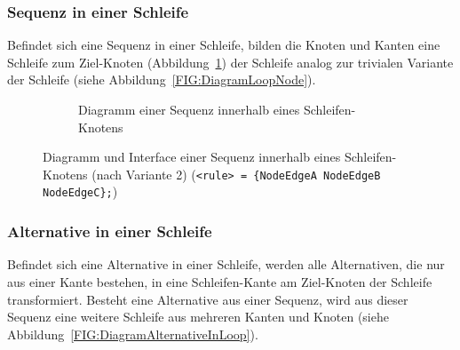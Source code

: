 \documentclass[../InterneDSLs.tex]{subfiles}
\begin{document}
\subsubsection{Sequenz in einer Schleife}
Befindet sich eine Sequenz in einer Schleife, bilden die Knoten und Kanten eine Schleife zum Ziel-Knoten (Abbildung~\ref{FIG:DiagramSequenceInLoop}) der Schleife analog zur trivialen Variante der Schleife (siehe Abbildung~\ref{FIG:DiagramLoopNode}).
\begin{figure}[ht]
\centering
  \begin{subfigure}[c]{0.49\textwidth}
    \caption{Diagramm einer Sequenz innerhalb eines Schleifen-Knotens}
    \label{FIG:DiagramSequenceInLoop}
  \end{subfigure}
  \begin{subfigure}[c]{0.49\textwidth}
    
  \end{subfigure}
  \caption{Diagramm und Interface einer Sequenz innerhalb eines Schleifen-Knotens (nach Variante 2) (\texttt{<rule> = \{NodeEdgeA NodeEdgeB NodeEdgeC\};})}
  \label{FIG:SequenceInLoop}
\end{figure}

\subsubsection{Alternative in einer Schleife}
Befindet sich eine Alternative in einer Schleife, werden alle Alternativen, die nur aus einer Kante bestehen, in eine Schleifen-Kante am Ziel-Knoten der Schleife transformiert. Besteht eine Alternative aus einer Sequenz, wird aus dieser Sequenz eine weitere Schleife aus mehreren Kanten und Knoten (siehe Abbildung~\ref{FIG:DiagramAlternativeInLoop}).
\end{document}
